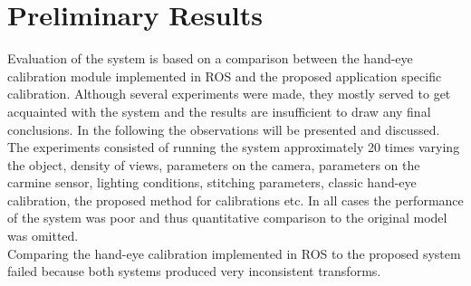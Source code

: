 \chapter{Preliminary Results}
Evaluation of the system is based on a comparison between the hand-eye calibration module implemented in ROS and the proposed application specific calibration. Although several experiments were made, they mostly served to get acquainted with the system and the results are insufficient to draw any final conclusions. In the following the observations will be presented and discussed.\\

The experiments consisted of running the system approximately 20 times varying the object, density of views, parameters on the camera, parameters on the carmine sensor, lighting conditions, stitching parameters, classic hand-eye calibration, the proposed method for calibrations etc. In all cases the performance of the system was poor and thus quantitative comparison to the original model was omitted. \\

Comparing the hand-eye calibration implemented in ROS to the proposed system failed because both systems produced very inconsistent transforms.\\